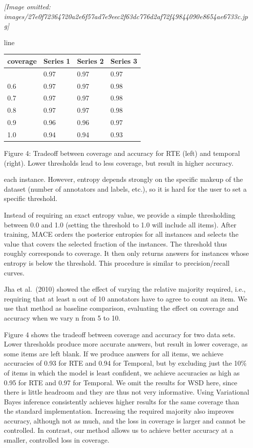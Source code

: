 \documentclass[
]{article}
\newcounter{none} %
\begin{document}
\textit{[Image omitted: images/27e0f72364720a2e6f57ad7e9eec2f63dc776d2af72f49844090e8654ae6733c.jpg]}

line

{\def\LTcaptype{none} %
\begin{longtable}[]{@{}llll@{}}
\toprule\noalign{}
coverage & Series 1 & Series 2 & Series 3 \\
\midrule\noalign{}
\endhead
\bottomrule\noalign{}
\endlastfoot
0.5 & 0.97 & 0.97 & 0.97 \\
0.6 & 0.97 & 0.97 & 0.98 \\
0.7 & 0.97 & 0.97 & 0.98 \\
0.8 & 0.97 & 0.97 & 0.98 \\
0.9 & 0.96 & 0.96 & 0.97 \\
1.0 & 0.94 & 0.94 & 0.93 \\
\end{longtable}
}

Figure 4: Tradeoff between coverage and accuracy for RTE (left) and
temporal (right). Lower thresholds lead to less coverage, but result in
higher accuracy.

each instance. However, entropy depends strongly on the specific makeup
of the dataset (number of annotators and labels, etc.), so it is hard
for the user to set a specific threshold.

Instead of requiring an exact entropy value, we provide a simple
thresholding between 0.0 and 1.0 (setting the threshold to 1.0 will
include all items). After training, MACE orders the posterior entropies
for all instances and selects the value that covers the selected
fraction of the instances. The threshold thus roughly corresponds to
coverage. It then only returns answers for instances whose entropy is
below the threshold. This procedure is similar to precision/recall
curves.

Jha et al.~(2010) showed the effect of varying the relative majority
required, i.e., requiring that at least n out of 10 annotators have to
agree to count an item. We use that method as baseline comparison,
evaluating the effect on coverage and accuracy when we vary n from 5 to
10.

Figure 4 shows the tradeoff between coverage and accuracy for two data
sets. Lower thresholds produce more accurate answers, but result in
lower coverage, as some items are left blank. If we produce answers for
all items, we achieve accuracies of 0.93 for RTE and 0.94 for Temporal,
but by excluding just the 10\% of items in which the model is least
confident, we achieve accuracies as high as 0.95 for RTE and 0.97 for
Temporal. We omit the results for WSD here, since there is little
headroom and they are thus not very informative. Using Variational Bayes
inference consistently achieves higher results for the same coverage
than the standard implementation. Increasing the required majority also
improves accuracy, although not as much, and the loss in coverage is
larger and cannot be controlled. In contrast, our method allows us to
achieve better accuracy at a smaller, controlled loss in coverage.
\end{document}
